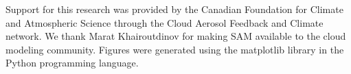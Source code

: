 \documentclass[acp]{copernicus}
\begin{document}
\begin{acknowledgements}
Support for this research was provided by the Canadian Foundation for Climate 
and Atmospheric Science through the Cloud Aerosol Feedback and Climate 
network. We thank Marat Khairoutdinov for making SAM available to the cloud 
modeling community. Figures were generated using the matplotlib library in the 
Python programming language.
\end{acknowledgements}


















\end{document}
